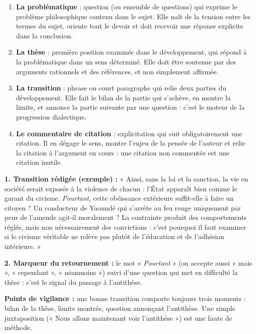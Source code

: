 \documentclass[11pt]{article}
\begin{document}
\begin{corrige}
\begin{enumerate}
\item \textbf{La problématique} : question (ou ensemble de questions) qui exprime le problème philosophique contenu dans le sujet. Elle naît de la tension entre les termes du sujet, oriente tout le devoir et doit recevoir une réponse explicite dans la conclusion.
\item \textbf{La thèse} : première position examinée dans le développement, qui répond à la problématique dans un sens déterminé. Elle doit être soutenue par des arguments rationnels et des références, et non simplement affirmée.
\item \textbf{La transition} : phrase ou court paragraphe qui relie deux parties du développement. Elle fait le bilan de la partie qui s'achève, en montre la limite, et annonce la partie suivante par une question : c'est le moteur de la progression dialectique.
\item \textbf{Le commentaire de citation} : explicitation qui suit obligatoirement une citation. Il en dégage le sens, montre l'enjeu de la pensée de l'auteur et relie la citation à l'argument en cours : une citation non commentée est une citation inutile.
\end{enumerate}
\end{corrige}

\begin{corrige}
\textbf{1. Transition rédigée (exemple) :} « Ainsi, sans la loi et la sanction, la vie en société serait exposée à la violence de chacun : l'État apparaît bien comme le garant du civisme. \emph{Pourtant}, cette obéissance extérieure suffit-elle à faire un citoyen ? Un conducteur de Yaoundé qui s'arrête au feu rouge uniquement par peur de l'amende agit-il moralement ? La contrainte produit des comportements réglés, mais non nécessairement des convictions : c'est pourquoi il faut examiner si le civisme véritable ne relève pas plutôt de l'éducation et de l'adhésion intérieure. »

\textbf{2. Marqueur du retournement :} le mot « \emph{Pourtant} » (on accepte aussi « mais », « cependant », « néanmoins ») suivi d'une question qui met en difficulté la thèse : c'est le signal du passage à l'antithèse.

\textbf{Points de vigilance :} une bonne transition comporte toujours trois moments : bilan de la thèse, limite montrée, question annonçant l'antithèse. Une simple juxtaposition (« Nous allons maintenant voir l'antithèse ») est une faute de méthode.
\end{corrige}
\end{document}
